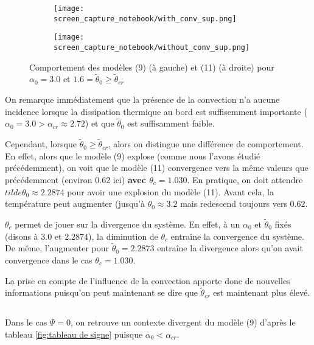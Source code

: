 \documentclass[10pt,a4paper]{report}
\begin{document}
\begin{figure}
		\centering
		\begin{subfigure}{}
        	\texttt{[image: screen\_capture\_notebook/with\_conv\_sup.png]}
    	\end{subfigure}
		\centering  	
   		\begin{subfigure}{}
        	\texttt{[image: screen\_capture\_notebook/without\_conv\_sup.png]}
    	\end{subfigure}
   	\caption{Comportement des modèles (9) (à gauche) et (11) (à droite) pour $\alpha_0 = 3.0$ et $1.6 = \tilde{\theta}_0 \geq \tilde{\theta}_{cr}$}
    \label{fig:comportement_selon_convection_sup}
	\end{figure}
	
On remarque immédiatement que la présence de la convection n'a aucune incidence lorsque la dissipation thermique au bord est suffisemment importante ($\alpha_0 = 3.0 > \alpha_{cr} \approx 2.72$) et que $\tilde{\theta}_0$ est suffisamment faible. 

Cependant, lorsque  $\tilde{\theta}_0 \geq \tilde{\theta}_{cr}$, alors on distingue une différence de comportement. En effet, alors que le modèle (9) explose (comme nous l'avons étudié précédemment), on voit que le modèle (11) convergence vers la même valeurs que précédemment (environ $0.62$ ici) \textbf{avec $\theta_c = 1.030$}. En pratique, on doit attendre $tilde{\theta}_0 \approx 2.2874$ pour avoir une explosion du modèle (11). Avant cela, la température peut augmenter (jusqu'à $\theta_0 \approx 3.2$ mais redescend toujours vers $0.62$.

$\theta_c$ permet de jouer sur la divergence du système. En effet, à un $\alpha_0$ et $\tilde{\theta}_0$ fixés (disons à $3.0$ et $2.2874$), la diminution de $\theta_c$ entraîne la convergence du système. De même, l'augmenter pour $\tilde{\theta}_0 = 2.2873$ entraîne la divergence alors qu'on avait convergence dans le cas $\theta_c = 1.030$.

La prise en compte de l'influence de la convection apporte donc de nouvelles informations puisqu'on peut maintenant se dire que $\tilde{\theta}_{cr}$ est maintenant plus élevé.

\subsection{}%

Dans le cas $\Psi = 0$, on retrouve un contexte divergent du modèle (9) d'après le tableau \ref{fig:tableau de signe} puisque $\alpha_0 < \alpha_{cr}$.
\end{document}
